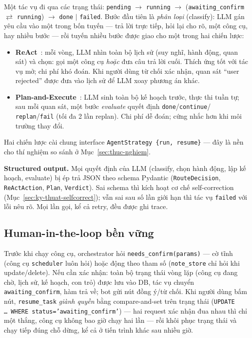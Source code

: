 Một tác vụ đi qua các trạng thái:
\texttt{pending} $\to$ \texttt{running} $\to$ (\texttt{awaiting\_confirm}
$\rightleftarrows$ \texttt{running}) $\to$ \texttt{done} $\mid$
\texttt{failed}. Bước đầu tiên là \emph{phân loại} (classify): LLM gán yêu cầu
vào một trong bốn tuyến --- trả lời trực tiếp, hỏi lại cho rõ, một công cụ, hay
nhiều bước --- rồi tuyến nhiều bước được giao cho một trong hai chiến lược:

\begin{itemize}
  \item \textbf{ReAct}~\cite{yao2023react}: mỗi vòng, LLM nhìn toàn bộ lịch sử
        (suy nghĩ, hành động, quan sát) và chọn: gọi một công cụ \emph{hoặc}
        đưa câu trả lời cuối. Thích ứng tốt với tác vụ mở; chi phí khó đoán.
        Khi người dùng từ chối xác nhận, quan sát ``user rejected'' được đưa
        vào lịch sử để LLM xoay phương án khác.
  \item \textbf{Plan-and-Execute}~\cite{wang2023planandsolve}: LLM sinh toàn bộ
        kế hoạch trước, thực thi tuần tự; sau mỗi quan sát, một bước
        \emph{evaluate} quyết định \texttt{done}/\texttt{continue}/%
        \texttt{replan}/\texttt{fail} (tối đa 2 lần replan). Chi phí dễ đoán;
        cứng nhắc hơn khi môi trường thay đổi.
\end{itemize}

Hai chiến lược cài chung interface \texttt{AgentStrategy \{run, resume\}} ---
đây là nền cho thí nghiệm so sánh ở Mục~\ref{sec:thuc-nghiem}.

\textbf{Structured output.} Mọi quyết định của LLM (classify, chọn hành động,
lập kế hoạch, evaluate) bị ép trả JSON theo schema Pydantic
(\texttt{RouteDecision}, \texttt{ReActAction}, \texttt{Plan},
\texttt{Verdict}). Sai schema thì kích hoạt cơ chế self-correction
(Mục~\ref{sec:ky-thuat-selfcorrect}); vẫn sai sau số lần giới hạn thì tác vụ
\texttt{failed} với lỗi nêu rõ. Mọi lần gọi, kể cả retry, đều được ghi trace.

\subsection{Human-in-the-loop bền vững}
\label{sec:hitl}

Trước khi chạy công cụ, orchestrator hỏi \texttt{needs\_confirm(params)} ---
cờ tĩnh (công cụ \texttt{scheduler} luôn hỏi) hoặc động theo tham số
(\texttt{note\_store} chỉ hỏi khi update/delete). Nếu cần xác nhận: toàn bộ
trạng thái vòng lặp (công cụ đang chờ, lịch sử, kế hoạch, con trỏ) được lưu
vào DB, tác vụ chuyển \texttt{awaiting\_confirm}, hàm trả về; bot gửi nút
đồng ý/từ chối. Khi người dùng bấm nút, \texttt{resume\_task} \emph{giành
quyền} bằng compare-and-set trên trạng thái (\texttt{UPDATE \dots\ WHERE
status='awaiting\_confirm'}) --- hai request xác nhận đua nhau thì chỉ một
thắng, công cụ không bao giờ chạy hai lần --- rồi khôi phục trạng thái và chạy
tiếp đúng chỗ dừng, kể cả ở tiến trình khác sau nhiều giờ.

